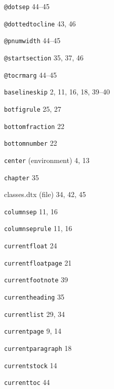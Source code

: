 \documentclass[11pt]{article}
\makeatletter
\newcommand{\tat}{@}
\providecommand{\indexfill}{}
\providecommand{\otherindexspace}[1]{}
\providecommand{\alphaindexspace}[1]{\indexspace{\bfseries #1}}
\makeatother
\begin{document}
\clearpage
%

%
\begin{theindex}



\otherindexspace{?}


\item \texttt  {\bs \tat dotsep}  \indexfill
   44--45
\item \texttt  {\bs \tat dottedtocline}  \indexfill
   43, 46
\item \texttt  {\bs \tat pnumwidth}  \indexfill
   44--45
\item \texttt  {\bs \tat startsection}  \indexfill
   35, 37, 46
\item \texttt  {\bs \tat tocrmarg}  \indexfill
   44--45

\alphaindexspace{B}


\item \texttt  {\bs baselineskip}  \indexfill
   2, 11, 16, 18, 39--40
\item \texttt  {\bs botfigrule}  \indexfill
   25, 27
\item \texttt  {\bs bottomfraction}  \indexfill
   22
\item \texttt  {\bs bottomnumber}  \indexfill
   22

\alphaindexspace{C}


\item \texttt  {center} (environment)  \indexfill
   4, 13
\item \texttt  {\bs chapter}  \indexfill
   35
\item {\textsf  {classes.dtx} (file)}  \indexfill
   34, 42, 45
\item \texttt  {\bs columnsep}  \indexfill
   11, 16
\item \texttt  {\bs columnseprule}  \indexfill
   11, 16
\item \texttt  {\bs currentfloat}  \indexfill
   24
\item \texttt  {\bs currentfloatpage}  \indexfill
   21
\item \texttt  {\bs currentfootnote}  \indexfill
   39
\item \texttt  {\bs currentheading}  \indexfill
   35
\item \texttt  {\bs currentlist}  \indexfill
   29, 34
\item \texttt  {\bs currentpage}  \indexfill
   9, 14
\item \texttt  {\bs currentparagraph}  \indexfill
   18
\item \texttt  {\bs currentstock}  \indexfill
   14
\item \texttt  {\bs currenttoc}  \indexfill
   44


\end{theindex}
\end{document}
